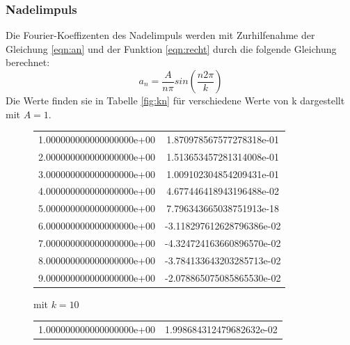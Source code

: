 \subsubsection{Nadelimpuls}
  Die Fourier-Koeffizenten des Nadelimpuls werden mit Zurhilfenahme der Gleichung \eqref{eqn:an} und der Funktion \eqref{eqn:recht} durch die folgende Gleichung berechnet:
  \begin{equation}
    a_n = \frac{A}{n\pi} sin\left(\frac{n2\pi}{k}\right)
  \end{equation}
  Die Werte finden sie in Tabelle \ref{fig:kn} für verschiedene Werte von k dargestellt mit $A=1$.
\begin{table}
  \centering
  \caption{Fourier-Koeffizenten eines Nadelimpulses}
  \label{fig:kn}
  \begin{subfigure}{0.48\textwidth}
    \centering
  \label{fig:kn10}
  \begin{tabular}{S[round-precision = 0] S}
    \toprule
      &  \\
    \midrule
    1.000000000000000000e+00 & 1.870978567577278318e-01\\
    2.000000000000000000e+00 & 1.513653457281314008e-01\\
    3.000000000000000000e+00 & 1.009102304854209431e-01\\
    4.000000000000000000e+00 & 4.677446418943196488e-02\\
    5.000000000000000000e+00 & 7.796343665038751913e-18\\
    6.000000000000000000e+00 & -3.118297612628796386e-02\\
    7.000000000000000000e+00 & -4.324724163660896570e-02\\
    8.000000000000000000e+00 & -3.784133643203285713e-02\\
    9.000000000000000000e+00 & -2.078865075085865530e-02\\
    \bottomrule
  \end{tabular}
  \caption{mit $k = 10$}
\end{subfigure}
  \begin{subfigure}{0.48\textwidth}
    \centering
  \label{fig:kn100}
  \begin{tabular}{S[round-precision = 0] S}
    \toprule
      &  \\
    \midrule
    1.000000000000000000e+00 & 1.998684312479682632e-02\\

\end{tabular}
\end{subfigure}
\end{table}
